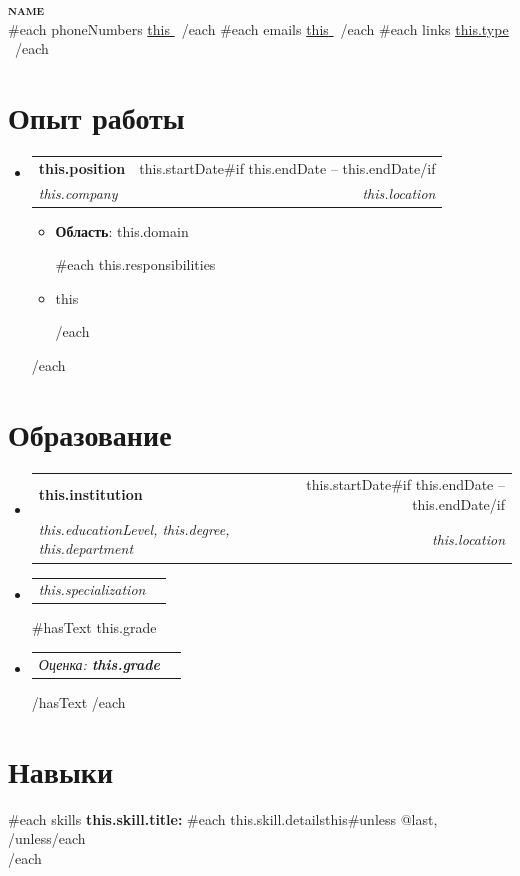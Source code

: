 \documentclass[letterpaper,11pt]{article}
\makeatletter
\newcommand{\resumeItem}[1]{
  \item\small{
    {#1 \vspace{-2pt}}
  }
}
\newcommand{\resumeSubheading}[4]{
  \vspace{-2pt}\item
    \begin{tabular*}{0.97\textwidth}[t]{l@{\extracolsep{\fill}}r}
      \textbf{#1} & #2 \\
      \textit{\small#3} & \textit{\small #4} \\
    \end{tabular*}\vspace{-7pt}
}
\newcommand{\resumeSubSubheading}[2]{
    \item
    \begin{tabular*}{0.97\textwidth}{l@{\extracolsep{\fill}}r}
      \textit{\small#1} & \textit{\small #2} \\
    \end{tabular*}\vspace{-7pt}
}
\newcommand{\resumeSubHeadingListStart}{\begin{itemize}[leftmargin=0.15in, label={}]}
\newcommand{\resumeSubHeadingListEnd}{\end{itemize}}
\newcommand{\resumeItemListStart}{\begin{itemize}}
\newcommand{\resumeItemListEnd}{\end{itemize}\vspace{-5pt}}
\makeatother
\begin{document}
\begin{center}
  \textbf{\Huge\scshape {{name}} } \\ \vspace{1pt}
  {{#each phoneNumbers}} \small{\underline{ {{this}} }}\, {{/each}}
  {{#each emails}} \small{\underline{ {{this}} }}\, {{/each}}
  {{#each links}} \small{\href{ {{this.url}} }{\underline{ {{this.type}} }}}\, {{/each}}
\end{center}

\section{Опыт работы}
  \resumeSubHeadingListStart
  {{#each workExperiences}}
    \resumeSubheading
    { {{this.position}} }{ {{this.startDate}}{{#if this.endDate}} -- {{this.endDate}}{{/if}} }
        { {{this.company}} }{ {{this.location}} }
        \resumeItemListStart
          \resumeItem{\textbf{Область}: {{this.domain}} }
          {{#each this.responsibilities}}
          \resumeItem{ {{this}} }
          {{/each}}
        \resumeItemListEnd
  {{/each}}
  \resumeSubHeadingListEnd

\section{Образование}
  \resumeSubHeadingListStart
  {{#each educations}}
    \resumeSubheading
    { {{this.institution}} } { {{this.startDate}}{{#if this.endDate}} -- {{this.endDate}}{{/if}} }
        { {{this.educationLevel}}, {{this.degree}}, {{this.department}} }{ {{this.location}} }
        \resumeSubSubheading
          { {{this.specialization}} }
          {}
        {{#hasText this.grade}}
        \resumeSubSubheading
          { Оценка:\textbf{ {{this.grade}} }}
          {}
        {{/hasText}}
  {{/each}}
  \resumeSubHeadingListEnd

\section{Навыки}
 \begin{itemize}[leftmargin=0.15in, label={}]
    \small{\item{
      {{#each skills}}
        \textbf{ {{this.skill.title}}: }{ {{#each this.skill.details}}{{this}}{{#unless @last}}, {{/unless}}{{/each}} } \\
      {{/each}}
    }}
 \end{itemize}
\end{document}
